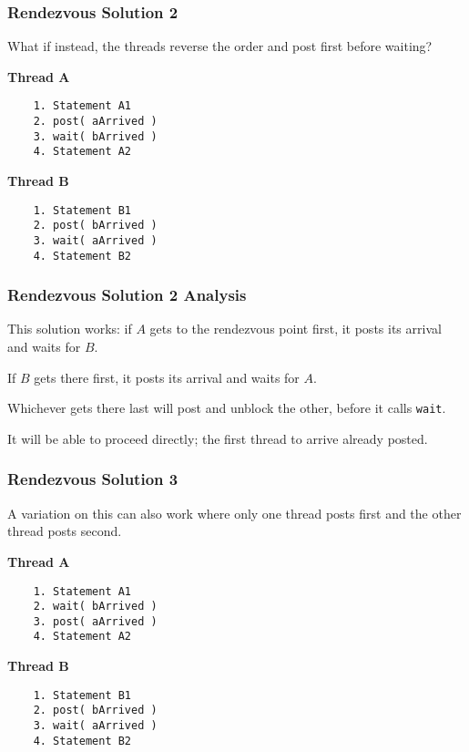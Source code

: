 \begin{frame}[fragile]
	\frametitle{Rendezvous Solution 2}

	What if instead, the threads reverse the order and post first before waiting?

	\begin{multicols}{2}
		\textbf{Thread A}
		\begin{verbatim}
	1. Statement A1
	2. post( aArrived )
	3. wait( bArrived )
	4. Statement A2
  		\end{verbatim}
		\columnbreak
		\textbf{Thread B}\vspace{-2em}
		\begin{verbatim}
	1. Statement B1
	2. post( bArrived )
	3. wait( aArrived )
	4. Statement B2
  		\end{verbatim}
	\end{multicols}
	\vspace{-2em}


\end{frame}

\begin{frame}
	\frametitle{Rendezvous Solution 2 Analysis}

	This solution works: if $A$ gets to the rendezvous point first, it posts its arrival and waits for $B$.

	If $B$ gets there first, it posts its arrival and waits for $A$.

	Whichever gets there last will post and unblock the other, before it calls \texttt{wait}.

	It will be able to proceed directly; the first thread to arrive already posted.


\end{frame}

\begin{frame}[fragile]
	\frametitle{Rendezvous Solution 3}

	A variation on this can also work where only one thread posts first and the other thread posts second.

	\begin{multicols}{2}
		\textbf{Thread A}
		\begin{verbatim}
	1. Statement A1
	2. wait( bArrived )
	3. post( aArrived )
	4. Statement A2
  		\end{verbatim}
		\columnbreak
		\textbf{Thread B}\vspace{-2em}
		\begin{verbatim}
	1. Statement B1
	2. post( bArrived )
	3. wait( aArrived )
	4. Statement B2
  		\end{verbatim}
	\end{multicols}
	\vspace{-2em}


\end{frame}

